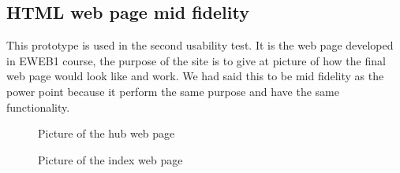 \subsection{HTML web page mid fidelity}
This prototype is used in the second usability test. It is the web page developed in EWEB1 course, the purpose of the site is to give at picture of how the final web page would look like and work. We had said this to be mid fidelity as the power point because it perform the same purpose and have the same functionality.
\begin{figure}[h!]
	\center
		\setlength\fboxsep{0pt}
		\setlength\fboxrule{1pt}
   	\caption{Picture of the hub web page}
   	\label{fig:web_hub_interface}
\end{figure}
\begin{figure}[h!]
	\center
		\setlength\fboxsep{0pt}
		\setlength\fboxrule{1pt}
   	\caption{Picture of the index web page}
   	\label{fig:web_index_interface}
\end{figure}

